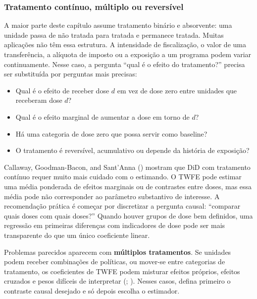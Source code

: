 \documentclass[
]{article}
\providecommand{\tightlist}{%
  \setlength{\itemsep}{0pt}\setlength{\parskip}{0pt}}
\begin{document}
\subsubsection{Tratamento contínuo, múltiplo ou reversível}\label{tratamento-contuxednuo-muxfaltiplo-ou-reversuxedvel}

A maior parte deste capítulo assume tratamento binário e absorvente: uma unidade passa de não tratada para tratada e permanece tratada. Muitas aplicações não têm essa estrutura. A intensidade de fiscalização, o valor de uma transferência, a alíquota de imposto ou a exposição a um programa podem variar continuamente. Nesse caso, a pergunta ``qual é o efeito do tratamento?'' precisa ser substituída por perguntas mais precisas:

\begin{itemize}
\tightlist
\item
  Qual é o efeito de receber dose \(d\) em vez de dose zero entre unidades que receberam dose \(d\)?
\item
  Qual é o efeito marginal de aumentar a dose em torno de \(d\)?
\item
  Há uma categoria de dose zero que possa servir como baseline?
\item
  O tratamento é reversível, acumulativo ou depende da história de exposição?
\end{itemize}

Callaway, Goodman-Bacon, and Sant'Anna () mostram que DiD com tratamento contínuo requer muito mais cuidado com o estimando. O TWFE pode estimar uma média ponderada de efeitos marginais ou de contrastes entre doses, mas essa média pode não corresponder ao parâmetro substantivo de interesse. A recomendação prática é começar por discretizar a pergunta causal: ``comparar quais doses com quais doses?'' Quando houver grupos de dose bem definidos, uma regressão em primeiras diferenças com indicadores de dose pode ser mais transparente do que um único coeficiente linear.

Problemas parecidos aparecem com \textbf{múltiplos tratamentos}. Se unidades podem receber combinações de políticas, ou mover-se entre categorias de tratamento, os coeficientes de TWFE podem misturar efeitos próprios, efeitos cruzados e pesos difíceis de interpretar (; ). Nesses casos, defina primeiro o contraste causal desejado e só depois escolha o estimador.
\end{document}
